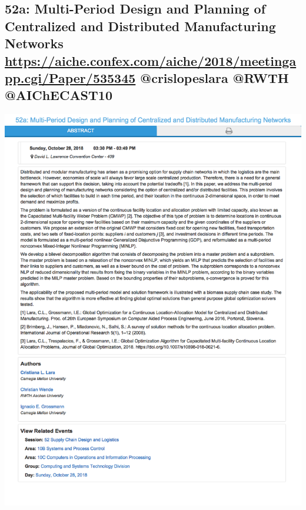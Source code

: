 \documentclass[11pt]{article}
\begin{document}
\subsection{52a: Multi-Period Design and Planning of Centralized and Distributed Manufacturing Networks \url{https://aiche.confex.com/aiche/2018/meetingapp.cgi/Paper/535345} @crislopeslara @RWTH @AIChECAST10}
\label{sec:orgce7a21e}
\begin{center}
\includegraphics[width=.9\linewidth]{./535345.png}
\end{center}
\end{document}
